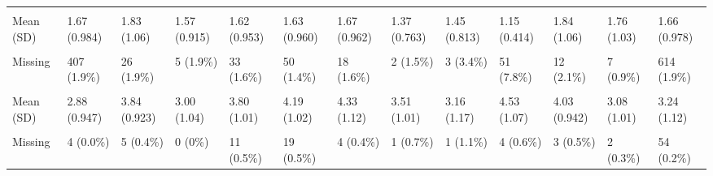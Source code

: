 \documentclass[
  single column]{article}
\begin{document}
\begin{landscape}
\begin{longtable}[t]{lllllllllllll}
\cellcolor{gray!10}{Rurality Classification (GCH 2018 Level)} & \cellcolor{gray!10}{} & \cellcolor{gray!10}{} & \cellcolor{gray!10}{} & \cellcolor{gray!10}{} & \cellcolor{gray!10}{} & \cellcolor{gray!10}{} & \cellcolor{gray!10}{} & \cellcolor{gray!10}{} & \cellcolor{gray!10}{} & \cellcolor{gray!10}{} & \cellcolor{gray!10}{} & \cellcolor{gray!10}{}\\
Mean (SD) & 1.67 (0.984) & 1.83 (1.06) & 1.57 (0.915) & 1.62 (0.953) & 1.63 (0.960) & 1.67 (0.962) & 1.37 (0.763) & 1.45 (0.813) & 1.15 (0.414) & 1.84 (1.06) & 1.76 (1.03) & 1.66 (0.978)\\
\cellcolor{gray!10}{Median [Min, Max]} & \cellcolor{gray!10}{1.00 [1.00, 5.00]} & \cellcolor{gray!10}{1.00 [1.00, 5.00]} & \cellcolor{gray!10}{1.00 [1.00, 5.00]} & \cellcolor{gray!10}{1.00 [1.00, 5.00]} & \cellcolor{gray!10}{1.00 [1.00, 5.00]} & \cellcolor{gray!10}{1.00 [1.00, 5.00]} & \cellcolor{gray!10}{1.00 [1.00, 4.00]} & \cellcolor{gray!10}{1.00 [1.00, 4.00]} & \cellcolor{gray!10}{1.00 [1.00, 4.00]} & \cellcolor{gray!10}{1.00 [1.00, 5.00]} & \cellcolor{gray!10}{1.00 [1.00, 5.00]} & \cellcolor{gray!10}{1.00 [1.00, 5.00]}\\
Missing & 407 (1.9\%) & 26 (1.9\%) & 5 (1.9\%) & 33 (1.6\%) & 50 (1.4\%) & 18 (1.6\%) & 2 (1.5\%) & 3 (3.4\%) & 51 (7.8\%) & 12 (2.1\%) & 7 (0.9\%) & 614 (1.9\%)\\
\addlinespace
\cellcolor{gray!10}{Right-Wing Authoritarianism} & \cellcolor{gray!10}{} & \cellcolor{gray!10}{} & \cellcolor{gray!10}{} & \cellcolor{gray!10}{} & \cellcolor{gray!10}{} & \cellcolor{gray!10}{} & \cellcolor{gray!10}{} & \cellcolor{gray!10}{} & \cellcolor{gray!10}{} & \cellcolor{gray!10}{} & \cellcolor{gray!10}{} & \cellcolor{gray!10}{}\\
Mean (SD) & 2.88 (0.947) & 3.84 (0.923) & 3.00 (1.04) & 3.80 (1.01) & 4.19 (1.02) & 4.33 (1.12) & 3.51 (1.01) & 3.16 (1.17) & 4.53 (1.07) & 4.03 (0.942) & 3.08 (1.01) & 3.24 (1.12)\\
\cellcolor{gray!10}{Median [Min, Max]} & \cellcolor{gray!10}{2.83 [1.00, 7.00]} & \cellcolor{gray!10}{3.83 [1.00, 7.00]} & \cellcolor{gray!10}{2.82 [1.00, 6.50]} & \cellcolor{gray!10}{3.83 [1.00, 7.00]} & \cellcolor{gray!10}{4.17 [1.00, 7.00]} & \cellcolor{gray!10}{4.33 [1.00, 7.00]} & \cellcolor{gray!10}{3.50 [1.60, 5.50]} & \cellcolor{gray!10}{3.10 [1.00, 6.00]} & \cellcolor{gray!10}{4.50 [1.00, 7.00]} & \cellcolor{gray!10}{4.00 [1.00, 7.00]} & \cellcolor{gray!10}{3.00 [1.00, 7.00]} & \cellcolor{gray!10}{3.17 [1.00, 7.00]}\\
Missing & 4 (0.0\%) & 5 (0.4\%) & 0 (0\%) & 11 (0.5\%) & 19 (0.5\%) & 4 (0.4\%) & 1 (0.7\%) & 1 (1.1\%) & 4 (0.6\%) & 3 (0.5\%) & 2 (0.3\%) & 54 (0.2\%)\\

\end{longtable}
\end{landscape}
\end{document}
